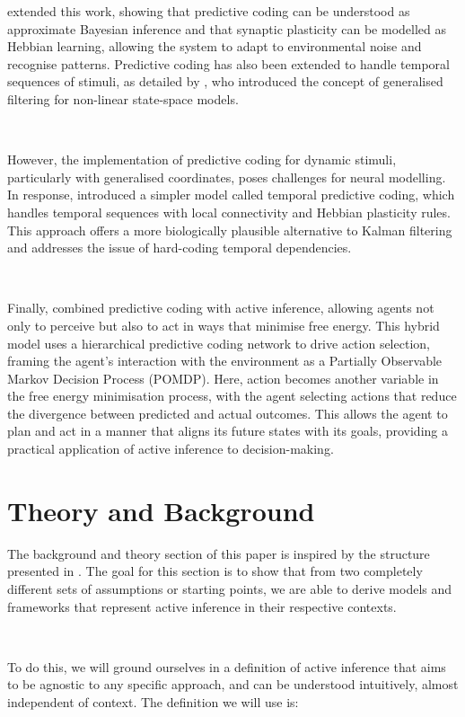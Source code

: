 \documentclass{article}
\begin{document}
\citet{friston2005theory} extended this work, showing that predictive coding can be understood as approximate Bayesian inference and that synaptic plasticity can be modelled as Hebbian learning, allowing the system to adapt to environmental noise and recognise patterns. Predictive coding has also been extended to handle temporal sequences of stimuli, as detailed by \citet{friston2010filtering}, who introduced the concept of generalised filtering for non-linear state-space models.

\

However, the implementation of predictive coding for dynamic stimuli, particularly with generalised coordinates, poses challenges for neural modelling. In response, \citet{millidge2024temporal} introduced a simpler model called temporal predictive coding, which handles temporal sequences with local connectivity and Hebbian plasticity rules. This approach offers a more biologically plausible alternative to Kalman filtering and addresses the issue of hard-coding temporal dependencies.

\

Finally, \citet{millidge2019combining} combined predictive coding with active inference, allowing agents not only to perceive but also to act in ways that minimise free energy. This hybrid model uses a hierarchical predictive coding network to drive action selection, framing the agent's interaction with the environment as a Partially Observable Markov Decision Process (POMDP). Here, action becomes another variable in the free energy minimisation process, with the agent selecting actions that reduce the divergence between predicted and actual outcomes. This allows the agent to plan and act in a manner that aligns its future states with its goals, providing a practical application of active inference to decision-making.

\section{Theory and Background}

The background and theory section of this paper is inspired by the structure presented in \citet{parr2022ActiveInference}. The goal for this section is to show that from two completely different sets of assumptions or starting points, we are able to derive models and frameworks that represent active inference in their respective contexts.

\

To do this, we will ground ourselves in a definition of active inference that aims to be agnostic to any specific approach, and can be understood intuitively, almost independent of context. The definition we will use is:
\end{document}
